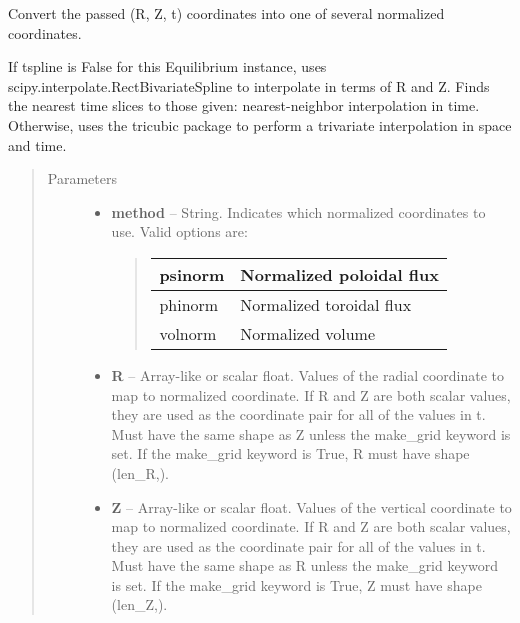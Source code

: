 \documentclass[letterpaper,10pt,english]{sphinxmanual}
\begin{document}
\begin{fulllineitems}
\begin{fulllineitems}
\end{fulllineitems}


\begin{fulllineitems}
\label{eqtools:eqtools.core.Equilibrium.rz2rho}
Convert the passed (R, Z, t) coordinates into one of several normalized coordinates.

If tspline is False for this Equilibrium instance, uses
scipy.interpolate.RectBivariateSpline to interpolate in terms of R and
Z. Finds the nearest time slices to those given: nearest-neighbor
interpolation in time. Otherwise, uses the tricubic package to perform
a trivariate interpolation in space and time.
\begin{quote}\begin{description}
\item[{Parameters }] \leavevmode\begin{itemize}
\item {} 
\textbf{method} --
String. Indicates which normalized coordinates to use.
Valid options are:
\begin{quote}

\begin{tabulary}{\linewidth}{|L|L|}
\hline

psinorm
 & 
Normalized poloidal flux
\\\hline

phinorm
 & 
Normalized toroidal flux
\\\hline

volnorm
 & 
Normalized volume
\\\hline
\end{tabulary}

\end{quote}

\item {} 
\textbf{R} --
Array-like or scalar float. Values of the radial coordinate to
map to normalized coordinate. If R and Z are both scalar values,
they are used as the coordinate pair for all of the values in t.
Must have the same shape as Z unless the make\_grid keyword is
set. If the make\_grid keyword is True, R must have shape (len\_R,).

\item {} 
\textbf{Z} --
Array-like or scalar float. Values of the vertical coordinate to
map to normalized coordinate. If R and Z are both scalar values,
they are used as the coordinate pair for all of the values in t.
Must have the same shape as R unless the make\_grid keyword is
set. If the make\_grid keyword is True, Z must have shape (len\_Z,).


\end{itemize}
\end{description}
\end{quote}
\end{fulllineitems}
\end{fulllineitems}
\end{document}
